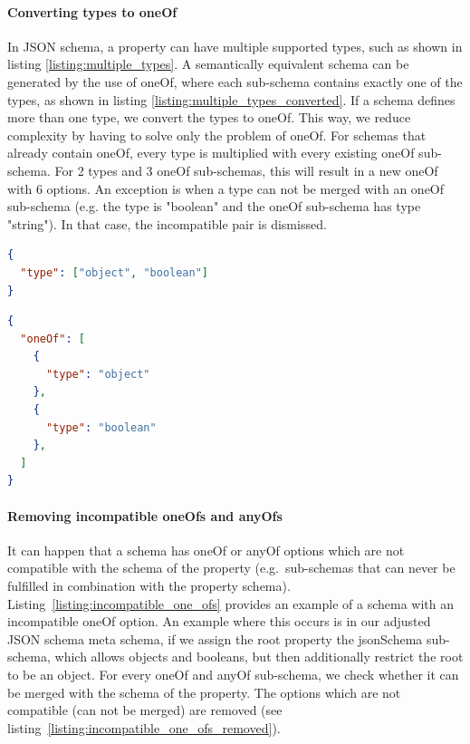 \paragraph{Converting types to oneOf}
In JSON schema, a property can have multiple supported types, such as shown in listing \ref{listing:multiple_types}.
A semantically equivalent schema can be generated by the use of oneOf, where each sub-schema contains exactly one of the types, as shown in listing \ref{listing:multiple_types_converted}.
If a schema defines more than one type, we convert the types to oneOf. This way, we reduce complexity by having to solve only the problem of oneOf.
For schemas that already contain oneOf, every type is multiplied with every existing oneOf sub-schema.
For 2 types and 3 oneOf sub-schemas, this will result in a new oneOf with 6 options.
An exception is when a type can not be merged with an oneOf sub-schema (e.g. the type is "boolean" and the oneOf sub-schema has type "string").
In that case, the incompatible pair is dismissed.

\begin{lstlisting}[language=json, firstnumber=1, caption=
    {Simple JSON schema with two possible types}, captionpos=b]
{
  "type": ["object", "boolean"]
}
\end{lstlisting}\label{listing:multiple_types}

\begin{lstlisting}[language=json, firstnumber=1, caption=
    {Simple JSON schema after conversion of types to oneOf}, captionpos=b]
{
  "oneOf": [
    {
      "type": "object"
    },
    {
      "type": "boolean"
    },
  ]
}
\end{lstlisting}\label{listing:multiple_types_converted}


\paragraph{Removing incompatible oneOfs and anyOfs}
It can happen that a schema has oneOf or anyOf options which are not compatible with the schema of the property (e.g.\ sub-schemas that can never be fulfilled in combination with the property schema).
Listing~\ref{listing:incompatible_one_ofs} provides an example of a schema with an incompatible oneOf option.
An example where this occurs is in our adjusted JSON schema meta schema, if we assign the root property the jsonSchema sub-schema, which allows objects and booleans, but then additionally restrict the root to be an object.
For every oneOf and anyOf sub-schema, we check whether it can be merged with the schema of the property.
The options which are not compatible (can not be merged) are removed (see listing~\ref{listing:incompatible_one_ofs_removed}).

